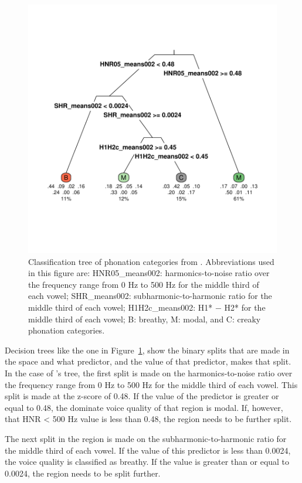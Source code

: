 \begin{figure}[!h]
    \centering
    \includegraphics[width = 0.9\linewidth]{images/keating_tree.pdf}
    \caption{Classification tree of phonation categories from \citet{keatingCrosslanguageAcousticSpace2023}. Abbreviations used in this figure are: {HNR05_means002}: harmonics-to-noise ratio over the frequency range from 0 Hz to 500 Hz for the middle third of each vowel; {SHR_means002}: subharmonic-to-harmonic ratio for the middle third of each vowel; {H1H2c_means002}: H1* − H2* for the middle third of each vowel; B: breathy, M: modal, and C: creaky phonation categories.}
    \label{fig:keating_tree}
\end{figure}

Decision trees like the one in Figure~\ref{fig:keating_tree}, show the binary splits that are made in the space and what predictor, and the value of that predictor, makes that split. In the case of \citeauthor{keatingCrosslanguageAcousticSpace2023}'s \citeyear{keatingCrosslanguageAcousticSpace2023} tree, the first split is made on the harmonics-to-noise ratio over the frequency range from 0 Hz to 500 Hz for the middle third of each vowel. This split is made at the z-score of 0.48. If the value of the predictor is greater or equal to 0.48, the dominate voice quality of that region is modal. If, however, that HNR < 500 Hz value is less than 0.48, the region needs to be further split. 

The next split in the region is made on the subharmonic-to-harmonic ratio for the middle third of each vowel. If the value of this predictor is less than 0.0024, the voice quality is classified as breathy. If the value is greater than or equal to 0.0024, the region needs to be split further.

